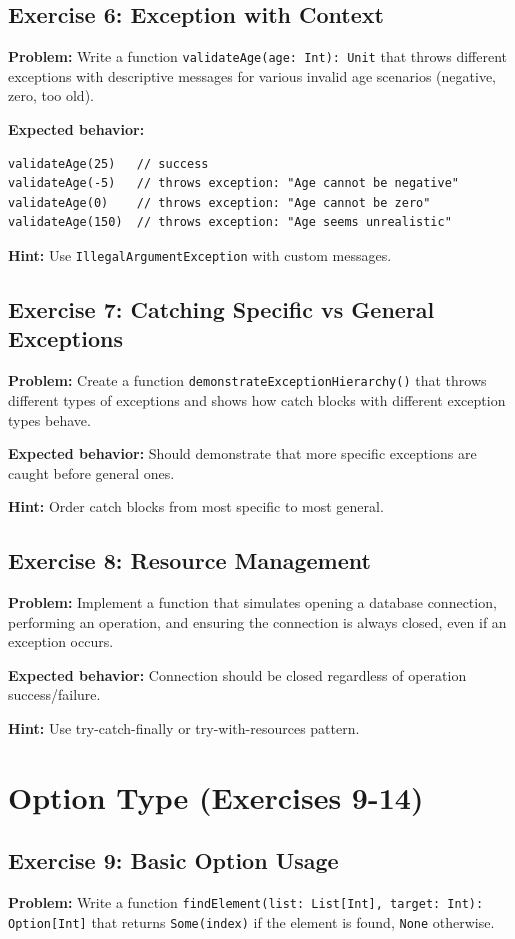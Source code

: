 \documentclass[12pt,a4paper]{article}
\begin{document}
\subsection{Exercise 6: Exception with Context}
\textbf{Problem:} Write a function \texttt{validateAge(age: Int): Unit} that throws different exceptions with descriptive messages for various invalid age scenarios (negative, zero, too old).

\textbf{Expected behavior:}
\begin{lstlisting}
validateAge(25)   // success
validateAge(-5)   // throws exception: "Age cannot be negative"
validateAge(0)    // throws exception: "Age cannot be zero"
validateAge(150)  // throws exception: "Age seems unrealistic"
\end{lstlisting}

\textbf{Hint:} Use \texttt{IllegalArgumentException} with custom messages.

\subsection{Exercise 7: Catching Specific vs General Exceptions}
\textbf{Problem:} Create a function \texttt{demonstrateExceptionHierarchy()} that throws different types of exceptions and shows how catch blocks with different exception types behave.

\textbf{Expected behavior:} Should demonstrate that more specific exceptions are caught before general ones.

\textbf{Hint:} Order catch blocks from most specific to most general.

\subsection{Exercise 8: Resource Management}
\textbf{Problem:} Implement a function that simulates opening a database connection, performing an operation, and ensuring the connection is always closed, even if an exception occurs.

\textbf{Expected behavior:} Connection should be closed regardless of operation success/failure.

\textbf{Hint:} Use try-catch-finally or try-with-resources pattern.

\section{Option Type (Exercises 9-14)}

\subsection{Exercise 9: Basic Option Usage}
\textbf{Problem:} Write a function \texttt{findElement(list: List[Int], target: Int): Option[Int]} that returns \texttt{Some(index)} if the element is found, \texttt{None} otherwise.
\end{document}
